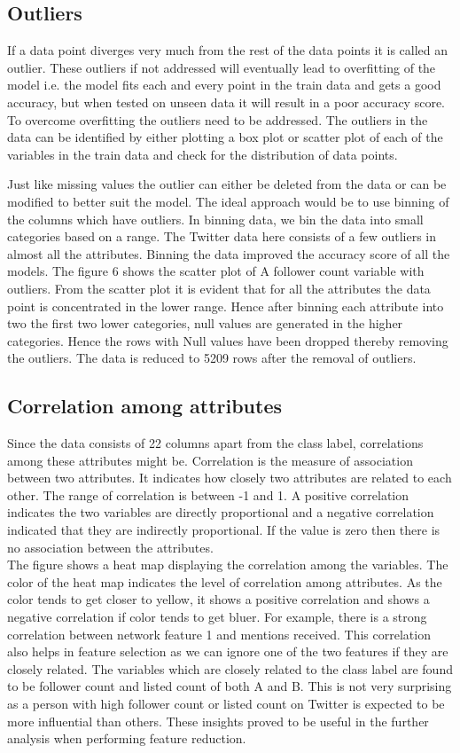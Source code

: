 \documentclass[sigconf]{acmart}
\begin{document}
\subsection{Outliers}
If a data point diverges very much from the rest of the data points it is called an outlier. These outliers if not addressed will eventually lead to overfitting of the model i.e. the model fits each and every point in the train data and gets a good accuracy, but when tested on unseen data it will result in a poor accuracy score. To overcome overfitting the outliers need to be addressed. The outliers in the data can be identified by either plotting a box plot or scatter plot of each of the variables in the train data and check for the distribution of data points.

Just like missing values the outlier can either be deleted from the data or can be modified to better suit the model. The ideal approach would be to use binning of the columns which have outliers. In binning data, we bin the data into small categories based on a range. The Twitter data here consists of a few outliers in almost all the attributes. Binning the data improved the accuracy score of all the models. The figure 6 shows the scatter plot of A follower count variable with outliers. From the scatter plot it is evident that for all the attributes the data point is concentrated in the lower range. Hence after binning each attribute into two the first two lower categories, null values are generated in the higher categories. Hence the rows with Null values have been dropped thereby removing the outliers. The data is reduced to 5209 rows after the removal of outliers. 

\subsection{Correlation among attributes}

Since the data consists of 22 columns apart from the class label, correlations among these attributes might be. Correlation is the measure of association between two attributes. It indicates how closely two attributes are related to each other. The range of correlation is between -1 and 1. A positive correlation indicates the two variables are directly proportional and a negative correlation indicated that they are indirectly proportional. If the value is zero then there is no association between the attributes.\\
The figure shows a heat map displaying the correlation among the variables. The color of the heat map indicates the level of correlation among attributes. As the color tends to get closer to yellow, it shows a positive correlation and shows a negative correlation if color tends to get bluer. For example, there is a strong correlation between network feature 1 and mentions received. This correlation also helps in feature selection as we can ignore one of the two features if they are closely related. The variables which are closely related to the class label are found to be follower count and listed count of both A and B. This is not very surprising as a person with high follower count or listed count on Twitter is expected to be more influential than others. These insights proved to be useful in the further analysis when performing feature reduction.
\end{document}
